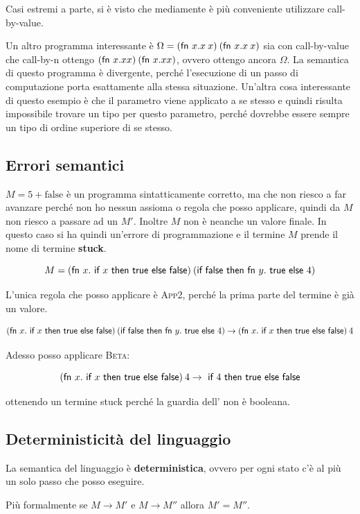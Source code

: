 Casi estremi a parte, si è visto che mediamente è più conveniente utilizzare call-by-value.

Un altro programma interessante è $\Omega = (\fn x.x \: x)\: (\fn x. x\:x)$ sia con call-by-value che call-by-n ottengo $(\fn x.x x)\: (\fn x.x x)$, ovvero ottengo ancora $\Omega$.
La semantica di questo programma è divergente, perché l'esecuzione di un passo di computazione porta esattamente alla stessa situazione.
Un'altra cosa interessante di questo esempio è che il parametro viene applicato a se stesso e quindi risulta impossibile trovare un tipo per questo parametro, perché dovrebbe essere sempre un tipo di ordine superiore di se stesso.

\subsection{Errori semantici}
$M = 5 + \text{false}$ è un programma sintatticamente corretto, ma che non riesco a far avanzare perché non ho nessun assioma o regola che posso applicare, quindi da $M$ non riesco a passare ad un $M'$. Inoltre $M$ non è neanche un valore finale.
In questo caso si ha quindi un'errore di programmazione e il termine $M$ prende il nome di termine \textbf{stuck}.


$$M = (\fn x.\iif x \text{ then true else false})\: (\text{if false then fn }y.\text{ true else } 4)$$

\noindent L'unica regola che posso applicare è \textsc{App2}, perché la prima parte del termine è già un valore.

$$(\fn x.\iif x \text{ then true else false}) \:(\text{if false then fn }y.\text{ true else } 4) \rightarrow (\fn x.\iif x \text{ then true else false})\: 4$$

\noindent Adesso posso applicare \textsc{Beta}:

$$(\fn x.\iif x \text{ then true else false})\: 4 \rightarrow \iif 4 \text{ then true else false}$$

\noindent ottenendo un termine stuck perché la guardia dell' non è booleana.

\subsection{Deterministicità del linguaggio}

La semantica del linguaggio è \textbf{deterministica}, ovvero per ogni stato c'è al più un solo passo che posso eseguire.

Più formalmente se $M \rightarrow M'$ e $M \rightarrow M''$ allora $M' = M''$.

